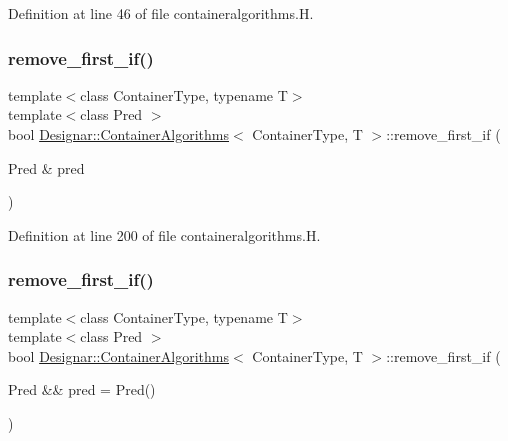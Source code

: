 Definition at line 46 of file containeralgorithms.\+H.

\mbox{\label{class_designar_1_1_container_algorithms_a955cc52c438153802a20a97d3e4c148a}} 
\subsubsection{\texorpdfstring{remove\+\_\+first\+\_\+if()}{remove\_first\_if()}\hspace{0.1cm}{\footnotesize\ttfamily [1/2]}}
{\footnotesize\ttfamily template$<$class Container\+Type, typename T$>$ \\
template$<$class Pred $>$ \\
bool \hyperlink{class_designar_1_1_container_algorithms}{Designar\+::\+Container\+Algorithms}$<$ Container\+Type, T $>$\+::remove\+\_\+first\+\_\+if (\begin{DoxyParamCaption}\item[{Pred \&}]{pred }\end{DoxyParamCaption})\hspace{0.3cm}{\ttfamily [inline]}}



Definition at line 200 of file containeralgorithms.\+H.

\mbox{\label{class_designar_1_1_container_algorithms_a564239c787d638bfd90846c9587cd6a6}} 
\subsubsection{\texorpdfstring{remove\+\_\+first\+\_\+if()}{remove\_first\_if()}\hspace{0.1cm}{\footnotesize\ttfamily [2/2]}}
{\footnotesize\ttfamily template$<$class Container\+Type, typename T$>$ \\
template$<$class Pred $>$ \\
bool \hyperlink{class_designar_1_1_container_algorithms}{Designar\+::\+Container\+Algorithms}$<$ Container\+Type, T $>$\+::remove\+\_\+first\+\_\+if (\begin{DoxyParamCaption}\item[{Pred \&\&}]{pred = {\ttfamily Pred()} }\end{DoxyParamCaption})\hspace{0.3cm}{\ttfamily [inline]}}



